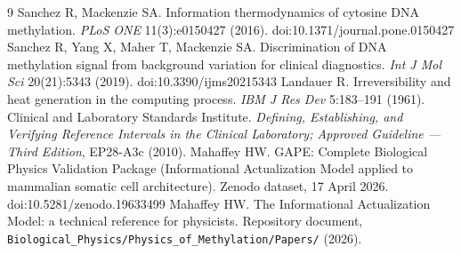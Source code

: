 \documentclass[12pt,a4paper]{article}
\begin{document}

\begin{thebibliography}{9}
 Sanchez R, Mackenzie SA. Information thermodynamics of cytosine DNA methylation. \emph{PLoS ONE} 11(3):e0150427 (2016). doi:10.1371/journal.pone.0150427
 Sanchez R, Yang X, Maher T, Mackenzie SA. Discrimination of DNA methylation signal from background variation for clinical diagnostics. \emph{Int J Mol Sci} 20(21):5343 (2019). doi:10.3390/ijms20215343
 Landauer R. Irreversibility and heat generation in the computing process. \emph{IBM J Res Dev} 5:183--191 (1961).
 Clinical and Laboratory Standards Institute. \emph{Defining, Establishing, and Verifying Reference Intervals in the Clinical Laboratory; Approved Guideline --- Third Edition}, EP28-A3c (2010).
 Mahaffey HW. GAPE: Complete Biological Physics Validation Package (Informational Actualization Model applied to mammalian somatic cell architecture). Zenodo dataset, 17 April 2026. doi:10.5281/zenodo.19633499
 Mahaffey HW. The Informational Actualization Model: a technical reference for physicists. Repository document, \texttt{Biological\_Physics/Physics\_of\_Methylation/Papers/} (2026).
\end{thebibliography}
\end{document}

